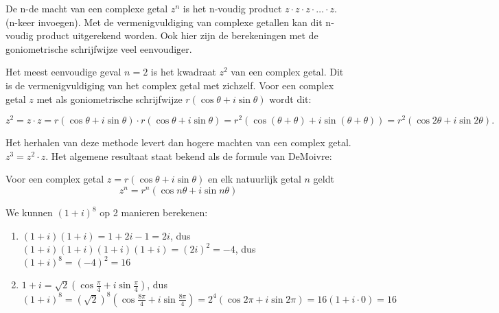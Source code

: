 \documentclass{ximera}
\begin{document}
    \author{Zomercursus KU Leuven}
     
    \label{xim:complexe_getallen_demoivre}
 




De n-de macht van een complexe getal \(z^n\) is het n-voudig product \(z \cdot z \cdot z \cdot \dots \cdot z \). (n-keer invoegen). Met de vermenigvuldiging van complexe getallen kan dit n-voudig product uitgerekend worden. Ook hier zijn de berekeningen met de goniometrische schrijfwijze veel eenvoudiger. 

Het meest eenvoudige geval \(n=2\) is het kwadraat \(z^2\) van een complex getal. Dit is de vermenigvuldiging van het complex getal met zichzelf. Voor een complex getal \(z\) met als goniometrische schrijfwijze \(r(\cos \theta + i \sin \theta ) \) wordt dit: 

\[
z^2 = z \cdot z  = r(\cos \theta + i \sin \theta ) \cdot r(\cos \theta + i \sin \theta ) = r^2(\cos (\theta + \theta) + i \sin (\theta + \theta) ) =  r^2(\cos 2\theta + i \sin 2\theta ). 
\]

Het herhalen van deze methode levert dan hogere machten van een complex getal.  \(z^3 = z^2 \cdot z \). Het algemene resultaat staat bekend als de formule van DeMoivre: 
 
\begin{proposition}\nl 
Voor een complex getal $z= r (\cos \theta + i \sin \theta )$ en elk natuurlijk getal $n$ geldt
\[
z^n = r^n(\cos n\theta + i \sin n\theta )
\]
\end{proposition}
 
\begin{example}
    We kunnen $(1+i)^8$ op 2 manieren berekenen:         
        \begin{enumerate}
            \item $(1+i)(1+i)=1+2i-1=2i$, dus $(1+i)(1+i)(1+i)(1+i)=(2i)^2=-4$, dus $(1+i)^8=(-4)^2=16$
            \item $1+i=\sqrt{2}(\cos \frac{\pi}{4}+i\sin\frac{\pi}{4})$, dus $(1+i)^8=(\sqrt{2})^8(\cos  \frac{8\pi}{4}+i\sin \frac{8\pi}{4})=2^4(\cos 2\pi +i \sin 2\pi)=16(1+i\cdot 0)=16$
        \end{enumerate}
         
    \end{example}
 
\end{document}
